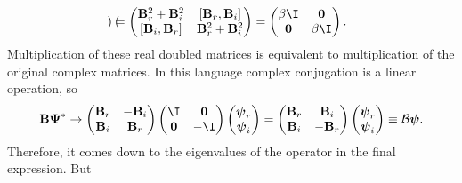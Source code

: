 \documentclass[11pt]{article}
\newcommand{\B}{\mathbf{B}}
\newcommand{\psib}{\boldsymbol{\psi}}
\newcommand{\Psib}{\boldsymbol{\Psi}}
\begin{document}
\begin{equation*}
\begin{gathered}
\begin{pmatrix}
         \end{pmatrix}
  =
         \begin{pmatrix}
           \B_r^2 + \B_i^2 & [\B_r, \B_i]    \\
           [\B_i, \B_r]    & \B_r^2 + \B_i^2 \\
         \end{pmatrix}
  =
         \begin{pmatrix}
           \beta \I   & \mathbf{0} \\
           \mathbf{0} & \beta \I   \\
         \end{pmatrix}
  .
\end{gathered}
\end{equation*}
%
Multiplication of these real doubled matrices is equivalent to multiplication of the original complex matrices.
In this language complex conjugation is a linear operation, so
%
\begin{equation*}
  \B \Psib^\ast \to
         \begin{pmatrix}
           \B_r & -\B_i \\
           \B_i &  \B_r \\
         \end{pmatrix}
         \begin{pmatrix}
           \I  & \mathbf{0} \\
           \mathbf{0} & -\I   \\
         \end{pmatrix}
         \begin{pmatrix}
           \psib_r \\
           \psib_i \\
         \end{pmatrix}
  =
         \begin{pmatrix}
           \B_r &  \B_i \\
           \B_i & -\B_r \\
         \end{pmatrix}
         \begin{pmatrix}
           \psib_r \\
           \psib_i \\
         \end{pmatrix}
  \equiv \mathcal{B} \psib.
\end{equation*}
%
Therefore, it comes down to the eigenvalues of the operator in the final expression.
But
%
\end{document}
